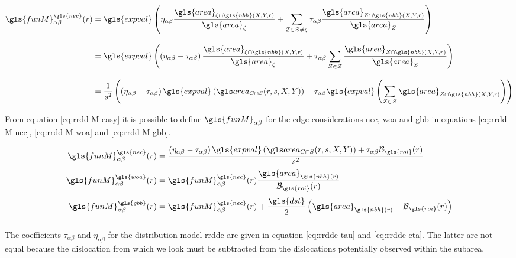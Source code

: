 \begin{align}
  \gls{funM}_{\alpha \beta}^{\gls{nec}} (r) &=
    \gls{expval} \left( \eta_{\alpha \beta} \frac{\gls{area}_{\zeta \cap \gls{nbh}(X, Y, r)}}{\gls{area}_\zeta} + \sum_{Z \in \mathcal{Z} \neq \zeta} \tau_{\alpha \beta} \frac{\gls{area}_{Z \cap \gls{nbh}(X, Y, r)}}{\gls{area}_Z} \right)
    \label{eq:rrdd-M}
  \\[3mm]
  &=
    \gls{expval} \left( \left( \eta_{\alpha \beta} - \tau_{\alpha \beta} \right) \frac{\gls{area}_{\zeta \cap \gls{nbh}(X, Y, r)}}{\gls{area}_\zeta} + \tau_{\alpha \beta} \sum_{Z \in \mathcal{Z}} \frac{\gls{area}_{Z \cap \gls{nbh}(X, Y, r)}}{\gls{area}_Z} \right)
  \\[3mm]
  &=
    \frac{1}{s^2} \left( \left( \eta_{\alpha \beta} - \tau_{\alpha \beta} \right) \gls{expval} \left( \cirsqr(r, s, X, Y) \right) + \tau_{\alpha \beta} \gls{expval} \left( \sum_{Z \in \mathcal{Z}} \gls{area}_{Z \cap \gls{nbh}(X, Y, r)} \right) \right)
    \label{eq:rrdd-M-easy}
\end{align}

\medskip

From equation \eqref{eq:rrdd-M-easy} it is possible to define \( \gls{funM}_{\alpha \beta} \) for the edge considerations \gls{nec}, \gls{woa} and \gls{gbb} in equations \eqref{eq:rrdd-M-nec}, \eqref{eq:rrdd-M-woa} and \eqref{eq:rrdd-M-gbb}.

\begin{align}
  \gls{funM}^{\gls{nec}}_{\alpha \beta} (r) &=
    \frac{\left( \eta_{\alpha \beta} - \tau_{\alpha \beta} \right) \gls{expval} \left( \cirsqr(r, s, X, Y) \right) + \tau_{\alpha \beta} \mathcal{B}_{\gls{roi}}(r)}{s^2}
    \label{eq:rrdd-M-nec}
  \\[0.1cm]
  \gls{funM}^{\gls{woa}}_{\alpha \beta} (r) &=
    \gls{funM}^{\gls{nec}}_{\alpha \beta} (r) \frac{\gls{area}_{\gls{nbh}(r)}}{\mathcal{B}_{\gls{roi}}(r)}
    \label{eq:rrdd-M-woa}
  \\[0.1cm]
  \gls{funM}^{\gls{gbb}}_{\alpha \beta} (r) &=
    \gls{funM}^{\gls{nec}}_{\alpha \beta} (r) + \frac{\gls{dst}}{2} \left( \gls{area}_{\gls{nbh}(r)} - \mathcal{B}_{\gls{roi}}(r) \right)
    \label{eq:rrdd-M-gbb}
\end{align}

\subsubsection{}

The coefficients \( \tau_{\alpha \beta} \) and \( \eta_{\alpha \beta} \) for the distribution model \gls{rrdde} are given in equation \eqref{eq:rrdde-tau} and \eqref{eq:rrdde-eta}.
The latter are not equal because the dislocation from which we look must be subtracted from the dislocations potentially observed within the subarea.

